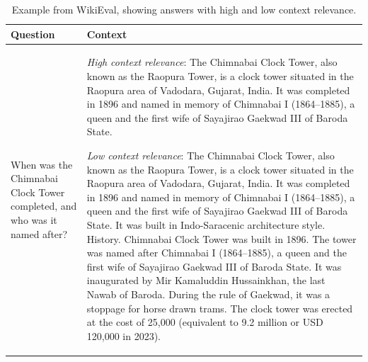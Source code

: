 \documentclass[11pt]{article}
\begin{document}
\begin{table}
\footnotesize
\centering
\begin{tabular}{p{90pt}p{330pt}}
\toprule
\textbf{Question} & \textbf{Context} \\
\midrule
When was the Chimnabai Clock Tower completed, and who was it named after?
& \textit{High context relevance}: The Chimnabai Clock Tower, also known as the Raopura Tower, is a clock tower situated in the Raopura area of Vadodara, Gujarat, India. It was completed in 1896 and named in memory of Chimnabai I (1864–1885), a queen and the first wife of Sayajirao Gaekwad III of Baroda State.

\smallskip
\textit{Low context relevance}: The Chimnabai Clock Tower, also known as the Raopura Tower, is a clock tower situated in the Raopura area of Vadodara, Gujarat, India. It was completed in 1896 and named in memory of Chimnabai I (1864–1885), a queen and the first wife of Sayajirao Gaekwad III of Baroda State. It was built in Indo-Saracenic architecture style. History. Chimnabai Clock Tower was built in 1896. The tower was named after Chimnabai I (1864–1885), a queen and the first wife of Sayajirao Gaekwad III of Baroda State. It was inaugurated by Mir Kamaluddin Hussainkhan, the last Nawab of Baroda. During the rule of Gaekwad, it was a stoppage for horse drawn trams. 
The clock tower was erected at the cost of 25,000 (equivalent to 9.2 million or USD 120,000 in 2023).\\
\bottomrule
\end{tabular}
\caption{Example from WikiEval, showing answers with high and low context relevance. \label{tabExamplesWikiEvalContextRelevance}}
\end{table}
\end{document}
